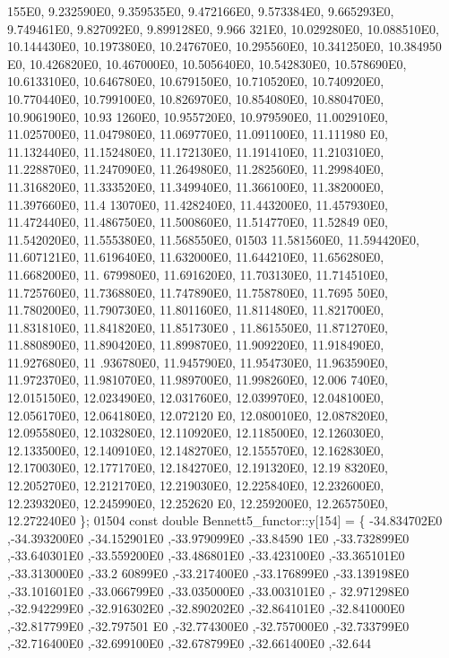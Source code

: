 \begin{DoxyCode}
      155E0, 9.232590E0, 9.359535E0, 9.472166E0, 9.573384E0, 9.665293E0, 9.749461E0, 9.827092E0, 9.899128E0, 9.966
      321E0, 10.029280E0, 10.088510E0, 10.144430E0, 10.197380E0, 10.247670E0, 10.295560E0, 10.341250E0, 10.384950
      E0, 10.426820E0, 10.467000E0, 10.505640E0, 10.542830E0, 10.578690E0, 10.613310E0, 10.646780E0, 10.679150E0, 
      10.710520E0, 10.740920E0, 10.770440E0, 10.799100E0, 10.826970E0, 10.854080E0, 10.880470E0, 10.906190E0, 10.93
      1260E0, 10.955720E0, 10.979590E0, 11.002910E0, 11.025700E0, 11.047980E0, 11.069770E0, 11.091100E0, 11.111980
      E0, 11.132440E0, 11.152480E0, 11.172130E0, 11.191410E0, 11.210310E0, 11.228870E0, 11.247090E0, 11.264980E0, 
      11.282560E0, 11.299840E0, 11.316820E0, 11.333520E0, 11.349940E0, 11.366100E0, 11.382000E0, 11.397660E0, 11.4
      13070E0, 11.428240E0, 11.443200E0, 11.457930E0, 11.472440E0, 11.486750E0, 11.500860E0, 11.514770E0, 11.52849
      0E0, 11.542020E0, 11.555380E0, 11.568550E0,
01503 11.581560E0, 11.594420E0, 11.607121E0, 11.619640E0, 11.632000E0, 11.644210E0, 11.656280E0, 11.668200E0, 11.
      679980E0, 11.691620E0, 11.703130E0, 11.714510E0, 11.725760E0, 11.736880E0, 11.747890E0, 11.758780E0, 11.7695
      50E0, 11.780200E0, 11.790730E0, 11.801160E0, 11.811480E0, 11.821700E0, 11.831810E0, 11.841820E0, 11.851730E0
      , 11.861550E0, 11.871270E0, 11.880890E0, 11.890420E0, 11.899870E0, 11.909220E0, 11.918490E0, 11.927680E0, 11
      .936780E0, 11.945790E0, 11.954730E0, 11.963590E0, 11.972370E0, 11.981070E0, 11.989700E0, 11.998260E0, 12.006
      740E0, 12.015150E0, 12.023490E0, 12.031760E0, 12.039970E0, 12.048100E0, 12.056170E0, 12.064180E0, 12.072120
      E0, 12.080010E0, 12.087820E0, 12.095580E0, 12.103280E0, 12.110920E0, 12.118500E0, 12.126030E0, 12.133500E0, 
      12.140910E0, 12.148270E0, 12.155570E0, 12.162830E0, 12.170030E0, 12.177170E0, 12.184270E0, 12.191320E0, 12.19
      8320E0, 12.205270E0, 12.212170E0, 12.219030E0, 12.225840E0, 12.232600E0, 12.239320E0, 12.245990E0, 12.252620
      E0, 12.259200E0, 12.265750E0, 12.272240E0 \};
01504 \textcolor{keyword}{const} \textcolor{keywordtype}{double} Bennett5\_functor::y[154] = \{ -34.834702E0 ,-34.393200E0 ,-34.152901E0 ,-33.979099E0 ,-33.84590
      1E0 ,-33.732899E0 ,-33.640301E0 ,-33.559200E0 ,-33.486801E0 ,-33.423100E0 ,-33.365101E0 ,-33.313000E0 ,-33.2
      60899E0 ,-33.217400E0 ,-33.176899E0 ,-33.139198E0 ,-33.101601E0 ,-33.066799E0 ,-33.035000E0 ,-33.003101E0 ,-
      32.971298E0 ,-32.942299E0 ,-32.916302E0 ,-32.890202E0 ,-32.864101E0 ,-32.841000E0 ,-32.817799E0 ,-32.797501
      E0 ,-32.774300E0 ,-32.757000E0 ,-32.733799E0 ,-32.716400E0 ,-32.699100E0 ,-32.678799E0 ,-32.661400E0 ,-32.644

\end{DoxyCode}
